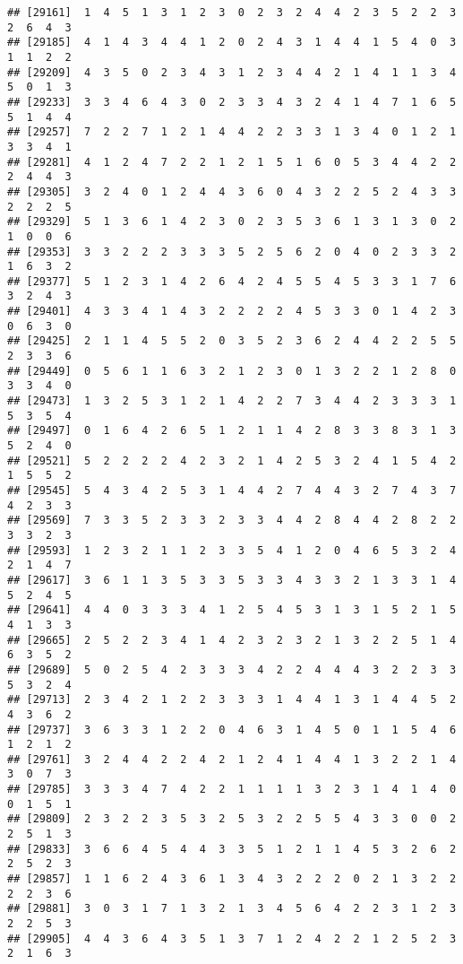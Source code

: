 \documentclass[
]{article}
\begin{document}
\begin{verbatim}
## [29161]  1  4  5  1  3  1  2  3  0  2  3  2  4  4  2  3  5  2  2  3  2  6  4  3
## [29185]  4  1  4  3  4  4  1  2  0  2  4  3  1  4  4  1  5  4  0  3  1  1  2  2
## [29209]  4  3  5  0  2  3  4  3  1  2  3  4  4  2  1  4  1  1  3  4  5  0  1  3
## [29233]  3  3  4  6  4  3  0  2  3  3  4  3  2  4  1  4  7  1  6  5  5  1  4  4
## [29257]  7  2  2  7  1  2  1  4  4  2  2  3  3  1  3  4  0  1  2  1  3  3  4  1
## [29281]  4  1  2  4  7  2  2  1  2  1  5  1  6  0  5  3  4  4  2  2  2  4  4  3
## [29305]  3  2  4  0  1  2  4  4  3  6  0  4  3  2  2  5  2  4  3  3  2  2  2  5
## [29329]  5  1  3  6  1  4  2  3  0  2  3  5  3  6  1  3  1  3  0  2  1  0  0  6
## [29353]  3  3  2  2  2  3  3  3  5  2  5  6  2  0  4  0  2  3  3  2  1  6  3  2
## [29377]  5  1  2  3  1  4  2  6  4  2  4  5  5  4  5  3  3  1  7  6  3  2  4  3
## [29401]  4  3  3  4  1  4  3  2  2  2  2  4  5  3  3  0  1  4  2  3  0  6  3  0
## [29425]  2  1  1  4  5  5  2  0  3  5  2  3  6  2  4  4  2  2  5  5  2  3  3  6
## [29449]  0  5  6  1  1  6  3  2  1  2  3  0  1  3  2  2  1  2  8  0  3  3  4  0
## [29473]  1  3  2  5  3  1  2  1  4  2  2  7  3  4  4  2  3  3  3  1  5  3  5  4
## [29497]  0  1  6  4  2  6  5  1  2  1  1  4  2  8  3  3  8  3  1  3  5  2  4  0
## [29521]  5  2  2  2  2  4  2  3  2  1  4  2  5  3  2  4  1  5  4  2  1  5  5  2
## [29545]  5  4  3  4  2  5  3  1  4  4  2  7  4  4  3  2  7  4  3  7  4  2  3  3
## [29569]  7  3  3  5  2  3  3  2  3  3  4  4  2  8  4  4  2  8  2  2  3  3  2  3
## [29593]  1  2  3  2  1  1  2  3  3  5  4  1  2  0  4  6  5  3  2  4  2  1  4  7
## [29617]  3  6  1  1  3  5  3  3  5  3  3  4  3  3  2  1  3  3  1  4  5  2  4  5
## [29641]  4  4  0  3  3  3  4  1  2  5  4  5  3  1  3  1  5  2  1  5  4  1  3  3
## [29665]  2  5  2  2  3  4  1  4  2  3  2  3  2  1  3  2  2  5  1  4  6  3  5  2
## [29689]  5  0  2  5  4  2  3  3  3  4  2  2  4  4  4  3  2  2  3  3  5  3  2  4
## [29713]  2  3  4  2  1  2  2  3  3  3  1  4  4  1  3  1  4  4  5  2  4  3  6  2
## [29737]  3  6  3  3  1  2  2  0  4  6  3  1  4  5  0  1  1  5  4  6  1  2  1  2
## [29761]  3  2  4  4  2  2  4  2  1  2  4  1  4  4  1  3  2  2  1  4  3  0  7  3
## [29785]  3  3  3  4  7  4  2  2  1  1  1  1  3  2  3  1  4  1  4  0  0  1  5  1
## [29809]  2  3  2  2  3  5  3  2  5  3  2  2  5  5  4  3  3  0  0  2  2  5  1  3
## [29833]  3  6  6  4  5  4  4  3  3  5  1  2  1  1  4  5  3  2  6  2  2  5  2  3
## [29857]  1  1  6  2  4  3  6  1  3  4  3  2  2  2  0  2  1  3  2  2  2  2  3  6
## [29881]  3  0  3  1  7  1  3  2  1  3  4  5  6  4  2  2  3  1  2  3  2  2  5  3
## [29905]  4  4  3  6  4  3  5  1  3  7  1  2  4  2  2  1  2  5  2  3  2  1  6  3

\end{verbatim}
\end{document}
